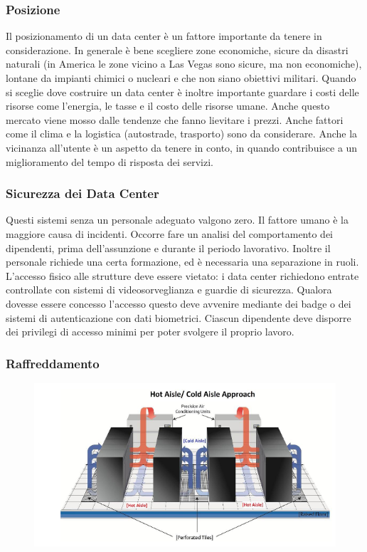 \documentclass{article}
\begin{document}
		\subsubsection{Posizione}\label{posizione}
		
		Il posizionamento di un data center è un fattore importante da
		tenere in considerazione. In generale è bene scegliere
		zone economiche, sicure da disastri
		naturali (in America le zone vicino a Las Vegas sono
		sicure, ma non economiche), lontane da impianti
		chimici o nucleari e che non siano obiettivi militari.
		Quando si sceglie dove costruire un data center è inoltre
		importante guardare i costi delle risorse come
		l'energia, le tasse e il
		costo delle risorse umane. Anche questo mercato
		viene mosso dalle tendenze che fanno
		lievitare i prezzi. Anche fattori come il
		clima e la logistica (autostrade,
		trasporto) sono da considerare. Anche la vicinanza
		all'utente è un aspetto da tenere in conto, in quando contribuisce a un
		miglioramento del tempo di risposta dei servizi.
		
		\subsubsection{Sicurezza dei Data Center}\label{sicurezza-dei-data-center}
		Questi sistemi senza un personale adeguato valgono zero. Il
		fattore umano è la maggiore causa di incidenti. Occorre
		fare un analisi del comportamento dei dipendenti,
		prima dell'assunzione e durante il periodo lavorativo.
		Inoltre il personale richiede una certa formazione, ed è
		necessaria una separazione in ruoli. L'accesso
		fisico alle strutture deve essere vietato: i data
		center richiedono entrate controllate con
		sistemi di videosorveglianza e guardie di
		sicurezza. Qualora dovesse essere concesso
		l'accesso questo deve avvenire mediante dei badge
		o dei sistemi di autenticazione con dati biometrici.
		Ciascun dipendente deve disporre dei privilegi di accesso
		minimi per poter svolgere il proprio lavoro.
		
		\subsubsection{Raffreddamento}\label{raffreddamento}
		\begin{figure}[ht]
			\centering
			\includegraphics[width=0.5\linewidth]{SAC_B7_cooling}
			\label{fig:sacb7cooling}
		\end{figure}
		
\end{document}
